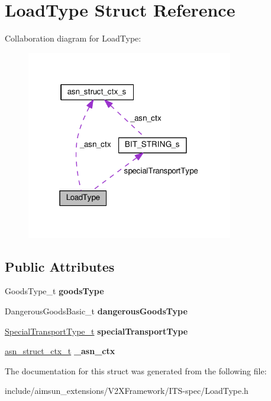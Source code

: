 \hypertarget{structLoadType}{}\section{Load\+Type Struct Reference}
\label{structLoadType}


Collaboration diagram for Load\+Type\+:\nopagebreak
\begin{figure}[H]
\begin{center}
\leavevmode
\includegraphics[width=256pt]{structLoadType__coll__graph}
\end{center}
\end{figure}
\subsection*{Public Attributes}
\begin{DoxyCompactItemize}
\item 
Goods\+Type\+\_\+t {\bfseries goods\+Type}\hypertarget{structLoadType_ae67a8dc4c9394a2aa1634d022bad3dfd}{}\label{structLoadType_ae67a8dc4c9394a2aa1634d022bad3dfd}

\item 
Dangerous\+Goods\+Basic\+\_\+t {\bfseries dangerous\+Goods\+Type}\hypertarget{structLoadType_aab3898abe43b1a1e55ec858c10cfd366}{}\label{structLoadType_aab3898abe43b1a1e55ec858c10cfd366}

\item 
\hyperlink{structBIT__STRING__s}{Special\+Transport\+Type\+\_\+t} {\bfseries special\+Transport\+Type}\hypertarget{structLoadType_a7b950006a6bcf2c2448f1515aced4900}{}\label{structLoadType_a7b950006a6bcf2c2448f1515aced4900}

\item 
\hyperlink{structasn__struct__ctx__s}{asn\+\_\+struct\+\_\+ctx\+\_\+t} {\bfseries \+\_\+asn\+\_\+ctx}\hypertarget{structLoadType_a94dd7fbe54976421c26ee51aa4b1da31}{}\label{structLoadType_a94dd7fbe54976421c26ee51aa4b1da31}

\end{DoxyCompactItemize}


The documentation for this struct was generated from the following file\+:\begin{DoxyCompactItemize}
\item 
include/aimsun\+\_\+extensions/\+V2\+X\+Framework/\+I\+T\+S-\/spec/Load\+Type.\+h\end{DoxyCompactItemize}
